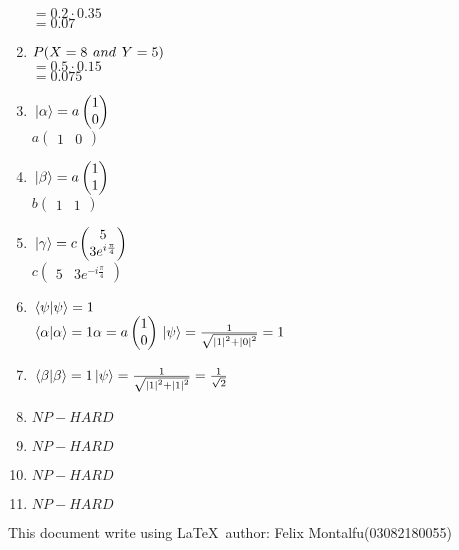 \documentclass[a4paper]{article}
\begin{document}
\begin{enumerate}[1.]
        $= 0.2 \cdot 0.35$\\
        $= 0.07$
        \item $P(X = 8 \hspace*{4px}and\hspace*{4px} Y = 5)$\\
        $= 0.5 \cdot 0.15$\\
        $= 0.075$
        \item $\ket*{\alpha} = a \begin{pmatrix}1 \\ 0\end{pmatrix}$\\
        $a \begin{pmatrix}1 & 0\end{pmatrix}$
        \item $\ket*{\beta} = a \begin{pmatrix}1 \\ 1\end{pmatrix}$\\
        $b\begin{pmatrix}1 & 1\end{pmatrix}$
        \item $\ket*{\gamma} = c \begin{pmatrix}5 \\ 3e^{i\frac{\pi}{4}}\end{pmatrix}$\\
        $c \begin{pmatrix}5 & 3e^{-i\frac{\pi}{4}}\end{pmatrix}$
        \item $\braket*{\psi}{\psi} = 1$\\
        $\braket*{\alpha}{\alpha}=1\\
        \alpha = a \begin{pmatrix}1 \\ 0\end{pmatrix}\\
        \ket*{\psi} = \frac{1}{\sqrt{\abs*{1}^2 + \abs*{0}^2}}\\
        =1$
        \item $\braket*{\beta}{\beta} = 1\\
        \ket*{\psi}=\frac{1}{\sqrt{\abs*{1}^2 + \abs*{1}^2}}\\
        =\frac{1}{\sqrt{2}}$
        \item $NP-HARD$
        \item $NP-HARD$
        \item $NP-HARD$
        \item $NP-HARD$
    \end{enumerate}
    This document write using \LaTeX \ author: Felix Montalfu(03082180055) 
\end{document}

